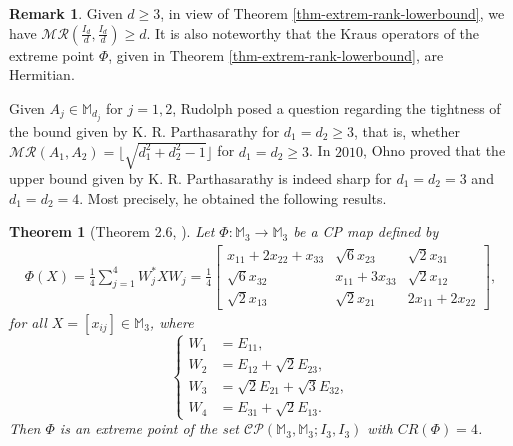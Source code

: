 \documentclass[10pt,reqno]{amsart}
\theoremstyle{definition}
\newtheorem{rmk}[defn]{Remark}
\theoremstyle{plain}
\newtheorem{thm}[defn]{Theorem}
\theoremstyle{remark}
\newcommand{\mbb}[1]{\mathbb{#1}}
\newcommand{\msc}[1]{\mathscr{#1}}
\newcommand{\M}[1]{\mbb{M}_{#1}}%
\newcommand{\Matrix}[1]{\begin{bmatrix}#1\end{bmatrix}}
\numberwithin{equation}{section}%
\begin{document}
\begin{rmk}
	Given $d\geq 3$, in view of Theorem \ref{thm-extrem-rank-lowerbound}, we have $\msc{MR}(\frac{I_d}{d},\frac{I_d}{d})\geq d$. It is also noteworthy that the Kraus operators of the extreme point $\Phi$, given in Theorem \ref{thm-extrem-rank-lowerbound}, are Hermitian.
\end{rmk}

   
   Given $A_j\in\M{d_j}$ for $j=1,2$, Rudolph \cite{Ru04} posed a question regarding the tightness of the bound given by K. R. Parthasarathy for $d_1 = d_2 \geq 3$, that is, whether $\msc{MR}(A_1, A_2)=\lfloor{\sqrt{d_1^2 + d_2^2 - 1}}\rfloor$ for $d_1 = d_2 \geq 3$. In $2010$, Ohno \cite{Ohno10} proved that the upper bound given by K. R. Parthasarathy is indeed sharp for $d_1 = d_2 = 3$ and $d_1 = d_2 = 4$. Most precisely, he obtained the following results. 
   
   
   
   \begin{thm}[Theorem 2.6, \cite{Ohno10}]\label{thm-extreme-rank-4}
   	Let $\Phi:\M{3}\to\M{3}$ be a CP map defined by 
   	\begin{align}\label{eq-extreme-rank-4-2}
   		\Phi(X)=\frac{1}{4}\sum_{j=1}^{4}W_j^*XW_j=\frac{1}{4}\Matrix{x_{11}+2x_{22}+x_{33}&\sqrt{6}x_{23}&\sqrt{2}x_{31}\\ \sqrt{6}x_{32}&x_{11}+3x_{33}&\sqrt{2}x_{12}\\ \sqrt{2}x_{13}&\sqrt{2}x_{21}&2x_{11}+2x_{22}},
   	\end{align}
   	for all $X=[x_{ij}]\in\M{3}$, where
   	\small
   	\begin{equation}\label{eq-extreme-rank-4}
   		\begin{cases}
   			W_1&=E_{11}, \\
   			W_2&=E_{12}+\sqrt{2}E_{23},\\
   			W_3&=\sqrt{2}E_{21}+\sqrt{3}E_{32},\\
   			W_4&=E_{31}+\sqrt{2}E_{13}.  
   		\end{cases}
   	\end{equation}
   	\normalsize
   	Then $\Phi$ is an extreme point of the set $\msc{CP}(\M{3},\M{3}; I_{3}, I_{3})$ with $CR(\Phi)=4$.
   \end{thm}
   
   
   
\end{document}
